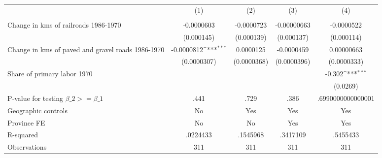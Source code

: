 {
\def\sym#1{\ifmmode^{#1}\else\(^{#1}\)\fi}
\begin{tabular}{l*{4}{c}}
\hline\hline
                &\multicolumn{1}{c}{(1)}&\multicolumn{1}{c}{(2)}&\multicolumn{1}{c}{(3)}&\multicolumn{1}{c}{(4)}\\
                &\multicolumn{1}{c}{}&\multicolumn{1}{c}{}&\multicolumn{1}{c}{}&\multicolumn{1}{c}{}\\
\hline
Change in kms of railroads 1986-1970&-0.0000603         &-0.0000723         &-0.00000663         &-0.0000522         \\
                &(0.000145)         &(0.000139)         &(0.000137)         &(0.000114)         \\
[1em]
Change in kms of paved and gravel roads 1986-1970&-0.0000812\sym{***}&0.0000125         &-0.0000459         &0.00000663         \\
                &(0.0000307)         &(0.0000368)         &(0.0000396)         &(0.0000333)         \\
[1em]
Share of primary labor 1970&                  &                  &                  &   -0.302\sym{***}\\
                &                  &                  &                  & (0.0269)         \\
\hline
P-value for testing $\beta\_{2} >= \beta\_{1}$&     .441         &     .729         &     .386         &.6990000000000001         \\
Geographic controls&       No         &      Yes         &      Yes         &      Yes         \\
Province FE     &       No         &       No         &      Yes         &      Yes         \\
R-squared       & .0224433         & .1545968         & .3417109         & .5455433         \\
Observations    &      311         &      311         &      311         &      311         \\
\hline\hline
\end{tabular}
}
